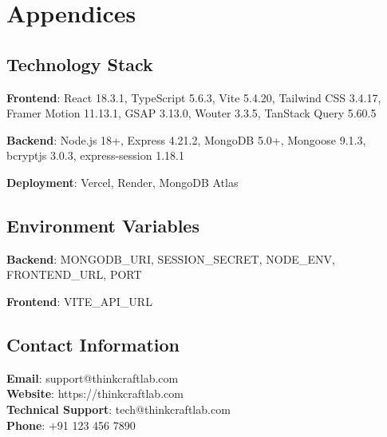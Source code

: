 \documentclass[11pt]{scrreprt}
\begin{document}
\chapter{Appendices}

\section{Technology Stack}
\textbf{Frontend}: React 18.3.1, TypeScript 5.6.3, Vite 5.4.20, Tailwind CSS 3.4.17, Framer Motion 11.13.1, GSAP 3.13.0, Wouter 3.3.5, TanStack Query 5.60.5

\textbf{Backend}: Node.js 18+, Express 4.21.2, MongoDB 5.0+, Mongoose 9.1.3, bcryptjs 3.0.3, express-session 1.18.1

\textbf{Deployment}: Vercel, Render, MongoDB Atlas

\section{Environment Variables}
\textbf{Backend}: MONGODB\_URI, SESSION\_SECRET, NODE\_ENV, FRONTEND\_URL, PORT

\textbf{Frontend}: VITE\_API\_URL

\section{Contact Information}
\textbf{Email}: support@thinkcraftlab.com\\
\textbf{Website}: https://thinkcraftlab.com\\
\textbf{Technical Support}: tech@thinkcraftlab.com\\
\textbf{Phone}: +91 123 456 7890
\end{document}
